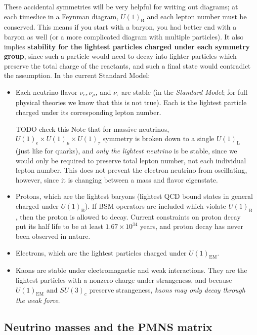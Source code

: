 \documentclass[11pt, oneside]{article}   	%
\theoremstyle{definition}
\numberwithin{equation}{subsection}		%
\begin{document}
These accidental symmetries will be very helpful for writing out diagrams; at each timeslice in a Feynman diagram, $U(1)_\mathrm{B}$ and 
each lepton number must be conserved. This means if you start with a baryon, you had better end with a baryon as well (or a more 
complicated diagram with multiple particles). It also implies \textbf{stability for the lightest particles charged under each symmetry group}, 
since such a particle would need to decay into lighter particles which preserve the total charge of the reactants, and such a final state would 
contradict the assumption. In the current Standard Model:
\begin{itemize}
	\item Each neutrino flavor $\nu_e, \nu_\mu$, and $\nu_\tau$ are stable (in the \textit{Standard Model}; for full physical theories we know 
	that this is not true). Each is the lightest particle charged under its corresponding 
	lepton number. 
	
	{\color{red} TODO check this}
	Note that for massive neutrinos, $U(1)_e\times U(1)_\mu\times U(1)_\tau$ symmetry is broken down to a 
	single $U(1)_\mathrm{L}$ (just like for quarks), and \textit{only the lightest neutrino} is be stable, since we would only be required to preserve total 
	lepton number, not each individual lepton number. This does not prevent the electron neutrino from oscillating, however, since it is 
	changing between a mass and flavor eigenstate. 
	\item Protons, which are the lightest baryons (lightest QCD bound states in general charged under $U(1)_\mathrm{B}$). If BSM 
	operators are included which violate $U(1)_\mathrm{B}$, then the proton is allowed to decay. Current constraints on proton decay put 
	its half life to be at least $1.67\times 10^{34}$ years, and proton decay has never been observed in nature.
	\item Electrons, which are the lightest particles charged under $U(1)_\mathrm{EM}$. 
	\item Kaons are stable under electromagnetic and weak interactions. They are the lightest particles with a nonzero charge under strangeness, 
	and because $U(1)_\mathrm{EM}$ and $SU(3)_c$ preserve strangeness, \textit{kaons may only decay through the weak force}. 
\end{itemize}

\subsection{Neutrino masses and the PMNS matrix}
\end{document}
